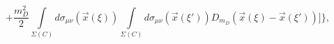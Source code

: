 \begin{equation}
\label{WCSig}
+\frac{m_D^2}{2}\int\limits_{\Sigma(C)}^{}d\sigma_{\mu\nu}(\vec x(\xi))
\int\limits_{\Sigma(C)}^{}d\sigma_{\mu\nu}(\vec x(\xi'))D_{m_D}\left(\vec x(\xi)-\vec x(\xi')\right)
\Biggr]\Biggr\},
\end{equation}

